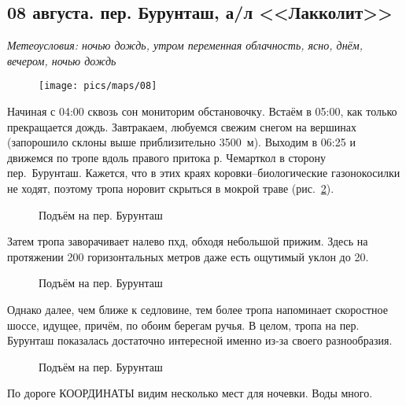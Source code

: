 \subsection{08 августа. пер. Бурунташ, а/л <<Лакколит>>}
\textit{Метеоусловия: ночью дождь, утром переменная облачность, ясно, днём, вечером, ночью дождь}

\begin{figure}[h!]
	\centering
	\texttt{[image: pics/maps/08]}
	\label{fig:08}
\end{figure}

Начиная с 04:00 сквозь сон мониторим обстановочку. Встаём в 05:00, как только прекращается дождь. Завтракаем, любуемся свежим снегом на вершинах (запорошило склоны выше приблизительно 3500~м). Выходим в 06:25 и движемся по тропе вдоль правого притока р. Чемарткол в сторону пер.~Бурунташ. Кажется, что в этих краях коровки--биологические газонокосилки не ходят, поэтому тропа норовит скрыться в мокрой траве (рис.~\ref{fig:burun_river}).

\begin{figure}[h!]
	\centering
	\caption{Подъём на пер. Бурунташ}
	\label{fig:burun_river}
\end{figure}

Затем тропа заворачивает налево пхд, обходя небольшой прижим. Здесь на протяжении 200 горизонтальных метров даже есть ощутимый уклон до 20\degree. 

\begin{figure}[h!]
	\centering
	\caption{Подъём на пер. Бурунташ}
	\label{fig:burun_uphill}
\end{figure}


Однако далее, чем ближе к седловине, тем более тропа напоминает скоростное шоссе, идущее, причём, по обоим берегам ручья. В целом, тропа на пер. Бурунташ показалась достаточно интересной именно из-за своего разнообразия.

\begin{figure}[h!]
	\centering
	\caption{Подъём на пер. Бурунташ}
	\label{fig:burun_uphill_1}
\end{figure}

По дороге КООРДИНАТЫ видим несколько мест для ночевки. Воды много.



